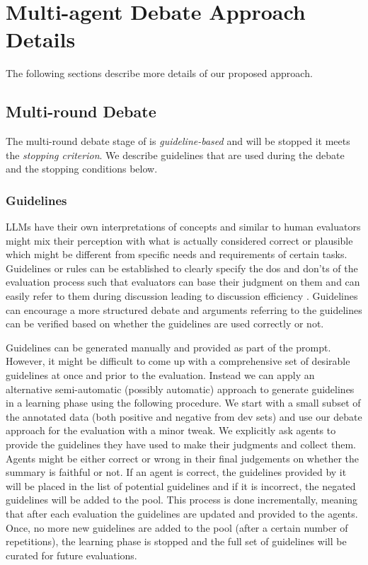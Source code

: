 \section{Multi-agent Debate Approach Details}
The following sections describe more details of our proposed approach.

\subsection{Multi-round Debate}
The multi-round debate stage of \method is \textit{guideline-based} and will be stopped it meets the \textit{stopping criterion}. We describe guidelines that are used during the debate and the stopping conditions below.

\subsubsection{Guidelines}\label{app:guidelines}
LLMs have their own interpretations of concepts and similar to human evaluators might mix their perception with what is actually considered correct or plausible \cite{elangovan2024considersthehumanevaluationframeworkrethinking} which might be different from specific needs and requirements of certain tasks. Guidelines or rules can be established to clearly specify the dos and don’ts of the evaluation process such that evaluators can base their judgment on them and can easily refer to them during discussion leading to discussion efficiency \cite{chen2019cicero}. Guidelines can encourage a more structured debate and arguments referring to the guidelines can be verified based on whether the guidelines are used correctly or not. 

Guidelines can be generated manually and provided as part of the prompt. However, it might be difficult to come up with a comprehensive set of desirable guidelines at once and prior to the evaluation. 
Instead we can apply an alternative semi-automatic (possibly automatic) approach to generate guidelines in a learning phase using the following procedure. We start with a small subset of the annotated data (both positive and negative from dev sets) and use our debate approach for the evaluation with a minor tweak. We explicitly ask agents to provide the guidelines they have used to make their judgments and collect them. Agents might be either correct or wrong in their final judgements on whether the summary is faithful or not. If an agent is correct, the guidelines provided by it will be placed in the list of potential guidelines and if it is incorrect, the negated guidelines will be added to the pool. This process is done incrementally, meaning that after each evaluation the guidelines are updated and provided to the agents. Once, no more new guidelines are added to the pool (after a certain number of repetitions), the learning phase is stopped and the full set of guidelines will be curated for future evaluations.

